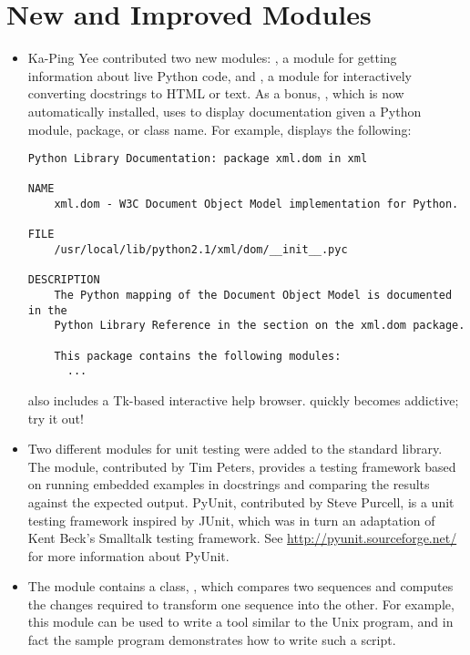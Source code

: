 \documentclass{howto}
\begin{document}
\section{New and Improved Modules}

\begin{itemize}

\item Ka-Ping Yee contributed two new modules: , a
module for getting information about live Python code, and
, a module for interactively converting docstrings to
HTML or text.  As a bonus, , which is now
automatically installed, uses  to display
documentation given a Python module, package, or class name.  For
example,  displays the following:

\begin{verbatim}
Python Library Documentation: package xml.dom in xml
 
NAME
    xml.dom - W3C Document Object Model implementation for Python.
 
FILE
    /usr/local/lib/python2.1/xml/dom/__init__.pyc
 
DESCRIPTION
    The Python mapping of the Document Object Model is documented in the
    Python Library Reference in the section on the xml.dom package.
 
    This package contains the following modules:
      ...
\end{verbatim}

 also includes a Tk-based interactive help browser.  
 quickly becomes addictive; try it out!

\item Two different modules for unit testing were added to the
standard library.  The  module, contributed by Tim
Peters, provides a testing framework based on running embedded
examples in docstrings and comparing the results against the expected
output.  PyUnit, contributed by Steve Purcell, is a unit testing
framework inspired by JUnit, which was in turn an adaptation of Kent
Beck's Smalltalk testing framework.  See
\url{http://pyunit.sourceforge.net/} for more information about
PyUnit.

\item The  module contains a class,
, which compares two sequences and computes the
changes required to transform one sequence into the other.  For
example, this module can be used to write a tool similar to the Unix
 program, and in fact the sample program
 demonstrates how to write such a script.  


\end{itemize}
\end{document}
